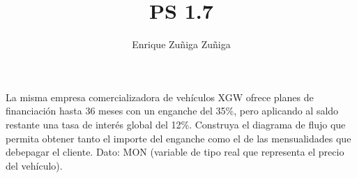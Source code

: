\documentclass[11pt]{amsart}
\title{PS 1.7}
\author{Enrique Zuñiga Zuñiga}
\begin{document}
\maketitle
\noindent La misma empresa comercializadora de vehículos XGW ofrece planes de financiación hasta 36 meses con un enganche del 35\%, pero aplicando al saldo restante una tasa de interés global del 12\%. \newline Construya el diagrama de flujo que permita obtener tanto el importe del enganche como el de las mensualidades que debepagar el cliente.\newline\newline
Dato: MON (variable de tipo real que representa el precio del vehículo).\newline
\end{document}
